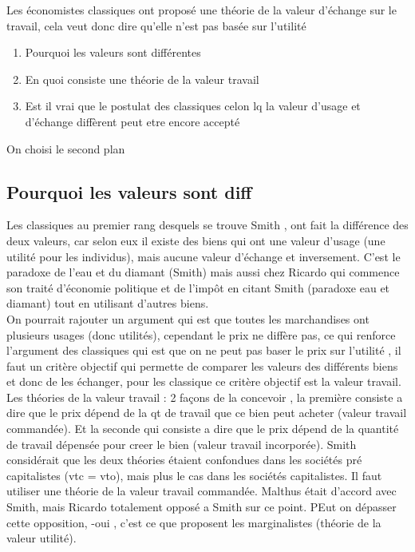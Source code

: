 \documentclass{article}
\begin{document}
 Les économistes classiques ont proposé une théorie de la valeur d'échange sur le travail, cela veut donc dire qu'elle n'est pas basée sur l'utilité
\begin{enumerate}
	\item Pourquoi les valeurs sont différentes
	\item En quoi consiste une théorie de la valeur travail
	\item Est il vrai que le postulat des classiques celon lq la valeur d'usage et d'échange diffèrent peut etre encore accepté
\end{enumerate}

On choisi le second plan 
\subsection{Pourquoi les valeurs sont diff}
Les classiques au premier rang desquels se trouve Smith , ont fait la différence des deux valeurs, car selon eux il existe des biens qui ont une valeur d'usage (une utilité pour les individus), mais aucune valeur d'échange et inversement. C'est le paradoxe de l'eau et du diamant (Smith) mais aussi chez Ricardo qui commence son traité d'économie politique et de l'impôt en citant Smith (paradoxe eau et diamant) tout en utilisant d'autres biens. \\
On pourrait rajouter un argument qui est que toutes les marchandises ont plusieurs usages (donc utilités), cependant le prix ne diffère pas, ce qui renforce l'argument des classiques qui est que on ne peut pas baser le prix sur l'utilité , il faut un critère objectif qui permette de comparer les valeurs des différents biens et donc de les échanger, pour les classique ce critère objectif est la valeur travail.
Les théories de la valeur travail : 2 façons de la concevoir , la première consiste a dire que le prix dépend de la qt de travail que ce bien peut acheter (valeur travail commandée). Et la seconde qui consiste a dire que le prix dépend de la quantité de travail dépensée pour creer le bien (valeur travail incorporée).
Smith considérait que les deux théories étaient confondues dans les sociétés pré capitalistes (vtc = vto), mais plus le cas dans les sociétés capitalistes. Il faut utiliser une théorie de la valeur travail commandée.
Malthus était d'accord avec Smith, mais Ricardo totalement opposé a Smith sur ce point. PEut on dépasser cette opposition, -oui , c'est ce que proposent les marginalistes (théorie de la valeur utilité).
\end{document}
